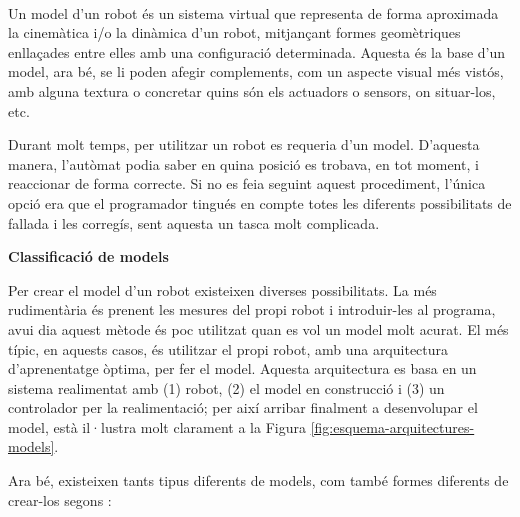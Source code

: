 \documentclass[12pt,a4paper,final,twoside]{article}
\begin{document}
\paragraph{}Un model d'un robot és un sistema virtual que representa de forma aproximada la cinemàtica i/o la dinàmica d'un robot, mitjançant formes geomètriques enllaçades entre elles amb una configuració determinada. Aquesta és la base d'un model, ara bé, se li poden afegir complements, com un aspecte visual més vistós, amb alguna textura o concretar quins són els actuadors o sensors, on situar-los, etc.

Durant molt temps, per utilitzar un robot es requeria d'un model. D'aquesta manera, l'autòmat podia saber en quina posició es trobava, en tot moment, i reaccionar de forma correcte. Si no es feia seguint aquest procediment, l'única opció era que el programador tingués en compte totes les diferents possibilitats de fallada i les corregís, sent aquesta un tasca molt complicada.  

\vspace{20pt}
\textbf{Classificació de models}

Per crear el model d'un robot existeixen diverses possibilitats. La més rudimentària és prenent les mesures del propi robot i introduir-les al programa, avui dia aquest mètode és poc utilitzat quan es vol un model molt acurat. El més típic, en aquests casos, és utilitzar el propi robot, amb una arquitectura d'aprenentatge òptima, per fer el model. Aquesta arquitectura es basa en un sistema realimentat amb (1) robot, (2) el model en construcció i (3) un controlador per la realimentació; per així arribar finalment a desenvolupar el model,  està il·lustra molt clarament a la Figura \ref{fig:esquema-arquitectures-models}.

Ara bé, existeixen tants tipus diferents de models, com també formes diferents de crear-los segons \cite{Nguyen-Tuong2011}:
\end{document}
